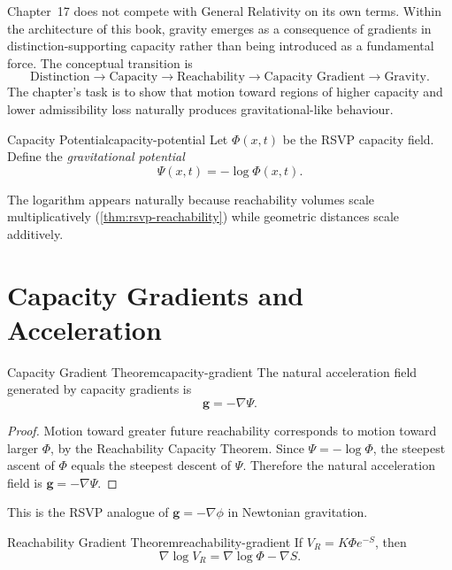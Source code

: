 \documentclass[12pt,twoside,openright]{book}
\begin{document}
Chapter~17 does not compete with General Relativity on its
own terms. Within the architecture of this book, gravity
emerges as a consequence of gradients in
distinction-supporting capacity rather than being
introduced as a fundamental force. The conceptual
transition is
\[
  \text{Distinction} \to \text{Capacity} \to \text{Reachability}
  \to \text{Capacity Gradient} \to \text{Gravity}.
\]
The chapter's task is to show that motion toward regions of
higher capacity and lower admissibility loss naturally
produces gravitational-like behaviour.

\begin{definition}{Capacity Potential}{capacity-potential}
  Let $\Phi(x,t)$ be the RSVP capacity field. Define the
  \emph{gravitational potential}
  \[
    \Psi(x,t) = -\log \Phi(x,t).
  \]
\end{definition}

The logarithm appears naturally because reachability
volumes scale multiplicatively (\cref{thm:rsvp-reachability})
while geometric distances scale additively.

\section{Capacity Gradients and Acceleration}
\label{sec:ch17-gradient}

\begin{theorem}{Capacity Gradient Theorem}{capacity-gradient}
  The natural acceleration field generated by capacity
  gradients is
  \[
    \mathbf{g} = -\nabla\Psi.
  \]
\end{theorem}

\begin{proof}
  Motion toward greater future reachability corresponds to
  motion toward larger $\Phi$, by the Reachability Capacity
  Theorem. Since $\Psi = -\log\Phi$, the steepest ascent of
  $\Phi$ equals the steepest descent of $\Psi$. Therefore
  the natural acceleration field is $\mathbf{g} = -\nabla\Psi$.
\end{proof}

This is the RSVP analogue of $\mathbf{g} = -\nabla\phi$ in
Newtonian gravitation.

\begin{theorem}{Reachability Gradient Theorem}{reachability-gradient}
  If $V_R = K\Phi e^{-S}$, then
  \[
    \nabla \log V_R = \nabla\log\Phi - \nabla S.
  \]
\end{theorem}
\end{document}
